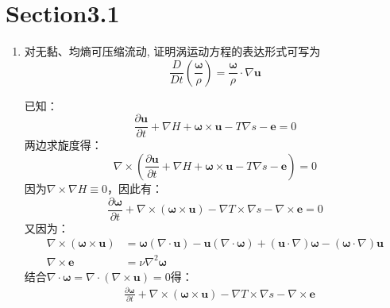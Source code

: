 \section*{Section3.1}

\begin{enumerate}
    \item 对无黏、均熵可压缩流动, 证明涡运动方程的表达形式可写为
    \[
    \frac{D}{D t}\left(\frac{\boldsymbol{\omega}}{\rho}\right)
    =\frac{\boldsymbol{\omega}}{\rho} \cdot \nabla \mathbf{u}
    \]

        已知：
        \begin{equation}
            \frac{\partial \mathbf{u}}{\partial t}+\nabla H+\boldsymbol{\omega} \times \mathbf{u}-T \nabla s-\mathbf{e}=0
        \end{equation}
        两边求旋度得：
        \begin{equation}
            \nabla \times \left(\frac{\partial \mathbf{u}}{\partial t}+\nabla H+\boldsymbol{\omega} \times \mathbf{u}-T \nabla s-\mathbf{e}\right)=0
        \end{equation}
        因为\( \nabla \times \nabla H \equiv 0 \)，因此有：
        \begin{equation}
            \frac{\partial \boldsymbol{\omega}}{\partial t}+\nabla \times(\boldsymbol{\omega} \times \mathbf{u})-\nabla T \times \nabla s-\nabla \times \mathbf{e}=0
        \end{equation}
        又因为：
        \begin{equation}
            \begin{aligned}
                \nabla \times(\boldsymbol{\omega} \times \mathbf{u})
                &= \boldsymbol{\omega}(\nabla \cdot \mathbf{u})-\mathbf{u}(\nabla \cdot \boldsymbol{\omega})+(\mathbf{u} \cdot \nabla) \boldsymbol{\omega}-(\boldsymbol{\omega} \cdot \nabla) \mathbf{u} \\
                \nabla \times \mathbf{e}
                &= \nu \nabla^{2} \boldsymbol{\omega}
            \end{aligned}
        \end{equation}
        结合\(\nabla \cdot \boldsymbol{\omega} = \nabla \cdot (\nabla \times \mathbf{u}) = 0\)得：
        \begin{equation}
            \begin{aligned}
                & \frac{\partial \boldsymbol{\omega}}{\partial t}+\nabla \times(\boldsymbol{\omega} \times \mathbf{u})-\nabla T \times \nabla s-\nabla \times \mathbf{e} \\

\end{aligned}
\end{equation}
\end{enumerate}
